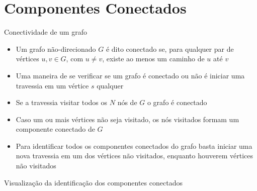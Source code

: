 \section{Componentes Conectados}

\begin{frame}[fragile]{Conectividade de um grafo}

    \begin{itemize}
        \item Um grafo não-direcionado $G$ é dito conectado se, para qualquer par de vértices 
            $u, v\in G$, com $u\neq v$, existe ao menos um caminho de $u$ até $v$

        \item Uma maneira de se verificar se um grafo é conectado ou não é iniciar uma travessia
            em um vértice $s$ qualquer

        \item Se a travessia visitar todos os $N$ nós de $G$ o grafo é conectado

        \item Caso um ou mais vértices não seja visitado, os nós visitados formam um 
            componente conectado de $G$

        \item Para identificar todos os componentes conectados do grafo basta iniciar uma nova
            travessia em um dos vértices não visitados, enquanto houverem vértices não
            visitados
    \end{itemize}

\end{frame}

\begin{frame}[fragile]{Visualização da identificação dos componentes conectados}


\end{frame}


